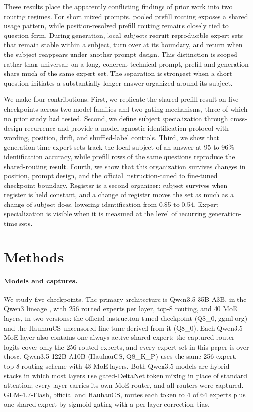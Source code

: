 \documentclass[10pt,twocolumn]{article}
\begin{document}
These results place the apparently conflicting findings of prior work into two routing regimes. For short mixed prompts, pooled prefill routing exposes a shared usage pattern, while position-resolved prefill routing remains closely tied to question form. During generation, local subjects recruit reproducible expert sets that remain stable within a subject, turn over at its boundary, and return when the subject reappears under another prompt design. This distinction is scoped rather than universal: on a long, coherent technical prompt, prefill and generation share much of the same expert set. The separation is strongest when a short question initiates a substantially longer answer organized around its subject.

We make four contributions. First, we replicate the shared prefill result on five checkpoints across two model families and two gating mechanisms, three of which no prior study had tested. Second, we define subject specialization through cross-design recurrence and provide a model-agnostic identification protocol with wording, position, drift, and shuffled-label controls. Third, we show that generation-time expert sets track the local subject of an answer at 95 to 96\% identification accuracy, while prefill rows of the same questions reproduce the shared-routing result. Fourth, we show that this organization survives changes in position, prompt design, and the official instruction-tuned to fine-tuned checkpoint boundary. Register is a second organizer: subject survives when register is held constant, and a change of register moves the set as much as a change of subject does, lowering identification from 0.85 to 0.54. Expert specialization is visible when it is measured at the level of recurring generation-time sets.

\section{Methods}

\paragraph{Models and captures.} We study five checkpoints. The primary architecture is Qwen3.5-35B-A3B, in the Qwen3 lineage \citep{yang2025qwen3}, with 256 routed experts per layer, top-8 routing, and 40 MoE layers, in two versions: the official instruction-tuned checkpoint (Q8\_0, ggml-org) and the HauhauCS uncensored fine-tune derived from it (Q8\_0). Each Qwen3.5 MoE layer also contains one always-active shared expert; the captured router logits cover only the 256 routed experts, and every expert set in this paper is over those. Qwen3.5-122B-A10B (HauhauCS, Q8\_K\_P) uses the same 256-expert, top-8 routing scheme with 48 MoE layers. Both Qwen3.5 models are hybrid stacks in which most layers use gated-DeltaNet token mixing in place of standard attention; every layer carries its own MoE router, and all routers were captured. GLM-4.7-Flash, official and HauhauCS, routes each token to 4 of 64 experts plus one shared expert by sigmoid gating with a per-layer correction bias.
\end{document}
